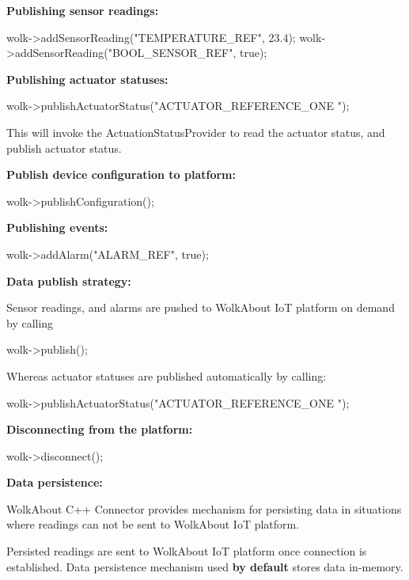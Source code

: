 {\bfseries Publishing sensor readings\+:} 
\begin{DoxyCode}
wolk->addSensorReading(\textcolor{stringliteral}{"TEMPERATURE\_REF"}, 23.4);
wolk->addSensorReading(\textcolor{stringliteral}{"BOOL\_SENSOR\_REF"}, \textcolor{keyword}{true});
\end{DoxyCode}


{\bfseries Publishing actuator statuses\+:} 
\begin{DoxyCode}
wolk->publishActuatorStatus(\textcolor{stringliteral}{"ACTUATOR\_REFERENCE\_ONE "});
\end{DoxyCode}
 This will invoke the Actuation\+Status\+Provider to read the actuator status, and publish actuator status.

{\bfseries Publish device configuration to platform\+:} 
\begin{DoxyCode}
wolk->publishConfiguration();
\end{DoxyCode}


{\bfseries Publishing events\+:} 
\begin{DoxyCode}
wolk->addAlarm(\textcolor{stringliteral}{"ALARM\_REF"}, \textcolor{keyword}{true});
\end{DoxyCode}


{\bfseries Data publish strategy\+:}

Sensor readings, and alarms are pushed to Wolk\+About IoT platform on demand by calling 
\begin{DoxyCode}
wolk->publish();
\end{DoxyCode}


Whereas actuator statuses are published automatically by calling\+:


\begin{DoxyCode}
wolk->publishActuatorStatus(\textcolor{stringliteral}{"ACTUATOR\_REFERENCE\_ONE "});
\end{DoxyCode}


{\bfseries Disconnecting from the platform\+:} 
\begin{DoxyCode}
wolk->disconnect();
\end{DoxyCode}


{\bfseries Data persistence\+:}

Wolk\+About C++ Connector provides mechanism for persisting data in situations where readings can not be sent to Wolk\+About IoT platform.

Persisted readings are sent to Wolk\+About IoT platform once connection is established. Data persistence mechanism used {\bfseries by default} stores data in-\/memory.

